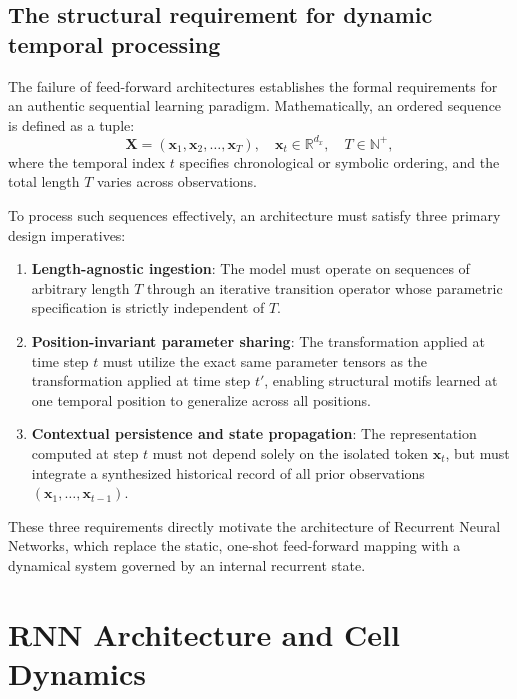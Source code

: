 \documentclass[../../../main.tex]{subfiles}
\begin{document}
\subsection{The structural requirement for dynamic temporal processing}
\label{subsec:rnn_dynamic_temporal_processing}

The failure of feed-forward architectures establishes the formal requirements for an authentic sequential learning paradigm. Mathematically, an ordered sequence is defined as a tuple:
\begin{equation}
\mathbf{X} = \left(\mathbf{x}_1, \mathbf{x}_2, \dots, \mathbf{x}_T\right), \quad \mathbf{x}_t \in \mathbb{R}^{d_x}, \quad T \in \mathbb{N}^+,
\end{equation}
where the temporal index $t$ specifies chronological or symbolic ordering, and the total length $T$ varies across observations.

To process such sequences effectively, an architecture must satisfy three primary design imperatives:
\begin{enumerate}
    \item \textbf{Length-agnostic ingestion}: The model must operate on sequences of arbitrary length $T$ through an iterative transition operator whose parametric specification is strictly independent of $T$.
    \item \textbf{Position-invariant parameter sharing}: The transformation applied at time step $t$ must utilize the exact same parameter tensors as the transformation applied at time step $t'$, enabling structural motifs learned at one temporal position to generalize across all positions.
    \item \textbf{Contextual persistence and state propagation}: The representation computed at step $t$ must not depend solely on the isolated token $\mathbf{x}_t$, but must integrate a synthesized historical record of all prior observations $\left(\mathbf{x}_1, \dots, \mathbf{x}_{t-1}\right)$.
\end{enumerate}

These three requirements directly motivate the architecture of Recurrent Neural Networks, which replace the static, one-shot feed-forward mapping with a dynamical system governed by an internal recurrent state.

\clearpage
\section{RNN Architecture and Cell Dynamics}
\label{sec:rnn_intuition_mechanics}
\end{document}
